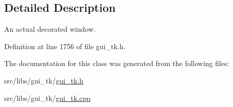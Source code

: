 \subsection{Detailed Description}
An actual decorated window. 

Definition at line 1756 of file gui\-\_\-tk.\-h.



The documentation for this class was generated from the following files\-:\begin{DoxyCompactItemize}
\item 
src/libs/gui\-\_\-tk/\hyperlink{gui__tk_8h}{gui\-\_\-tk.\-h}\item 
src/libs/gui\-\_\-tk/\hyperlink{gui__tk_8cpp}{gui\-\_\-tk.\-cpp}\end{DoxyCompactItemize}
